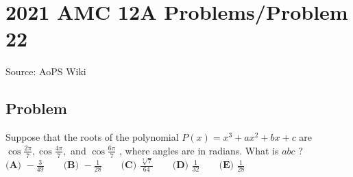 \documentclass[12pt]{article}
\begin{document}
\section*{{2021 AMC 12A Problems/Problem 22}}
Source: AoPS Wiki

\subsection*{Problem}
Suppose that the roots of the polynomial $P(x)=x^3+ax^2+bx+c$ are $\cos \frac{2\pi}7,\cos \frac{4\pi}7,$ and $\cos \frac{6\pi}7$ , where angles are in radians. What is $abc$ ? $\textbf{(A) }{-}\frac{3}{49} \qquad \textbf{(B) }{-}\frac{1}{28} \qquad \textbf{(C) }\frac{\sqrt[3]7}{64} \qquad \textbf{(D) }\frac{1}{32}\qquad \textbf{(E) }\frac{1}{28}$
\end{document}
